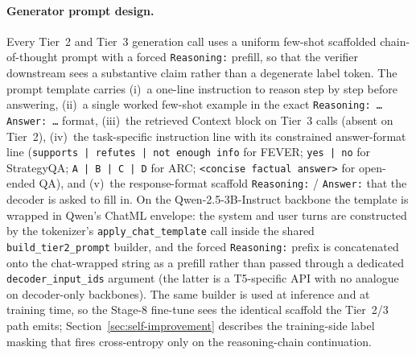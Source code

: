 \paragraph{Generator prompt design.} Every Tier~2 and Tier~3 generation call uses a uniform few-shot scaffolded chain-of-thought prompt with a forced \texttt{Reasoning:} prefill, so that the verifier downstream sees a substantive claim rather than a degenerate label token. The prompt template carries (i)~a one-line instruction to reason step by step before answering, (ii)~a single worked few-shot example in the exact \texttt{Reasoning: \ldots Answer: \ldots} format, (iii)~the retrieved Context block on Tier~3 calls (absent on Tier~2), (iv)~the task-specific instruction line with its constrained answer-format line (\texttt{supports | refutes | not enough info} for FEVER; \texttt{yes | no} for StrategyQA; \texttt{A | B | C | D} for ARC; \texttt{<concise factual answer>} for open-ended QA), and (v)~the response-format scaffold \texttt{Reasoning:} / \texttt{Answer:} that the decoder is asked to fill in. On the Qwen-2.5-3B-Instruct backbone the template is wrapped in Qwen's ChatML envelope: the system and user turns are constructed by the tokenizer's \texttt{apply\_chat\_template} call inside the shared \texttt{build\_tier2\_prompt} builder, and the forced \texttt{Reasoning:} prefix is concatenated onto the chat-wrapped string as a prefill rather than passed through a dedicated \texttt{decoder\_input\_ids} argument (the latter is a T5-specific API with no analogue on decoder-only backbones). The same builder is used at inference and at training time, so the Stage-8 fine-tune sees the identical scaffold the Tier~2/3 path emits; Section~\ref{sec:self-improvement} describes the training-side label masking that fires cross-entropy only on the reasoning-chain continuation.

